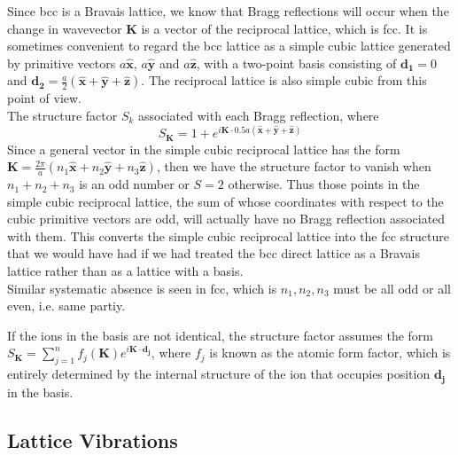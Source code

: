 \documentclass[a4paper]{article}
\begin{document}
\begin{eg}
Since bcc is a Bravais lattice, we know that Bragg reflections will occur when the change in wavevector $\mathbf{K}$ is a vector of the reciprocal lattice, which is fcc. It is sometimes convenient to regard the bcc lattice as a simple cubic lattice generated by primitive vectors $a\mathbf{\hat{x}}$, $a\mathbf{\hat{y}}$ and $a\mathbf{\hat{z}}$, with a two-point basis consisting of $\mathbf{d_1}=0$ and $\mathbf{d_2}=\frac{a}{2}(\mathbf{\hat{x}}+\mathbf{\hat{y}}+\mathbf{\hat{z}})$. The reciprocal lattice is also simple cubic from this point of view.\\[5pt]
The structure factor $S_k$ associated with each Bragg reflection, where $$S_\mathbf{K}=1+e^{i\mathbf{K}\cdot0.5a(\mathbf{\hat{x}}+\mathbf{\hat{y}}+\mathbf{\hat{z}})}$$
Since a general vector in the simple cubic reciprocal lattice has the form $\mathbf{K}=\frac{2\pi}{a}(n_1\mathbf{\hat{x}}+n_2\mathbf{\hat{y}}+n_3\mathbf{\hat{z}})$, then we have the structure factor to vanish when $n_1+n_2+n_3$ is an odd number or $S=2$ otherwise. Thus those points in the simple cubic reciprocal lattice, the sum of whose coordinates with respect to the cubic primitive vectors are odd, will actually have no Bragg reflection associated with them. This converts the simple cubic reciprocal lattice into the fcc structure that we would have had if we had treated the bcc direct lattice as a Bravais lattice rather than as a lattice with a basis.\\[5pt]
Similar systematic absence is seen in fcc, which is $n_1,n_2,n_3$ must be all odd or all even, i.e. same partiy.
\end{eg}
\begin{cor}
If the ions in the basis are not identical, the structure factor assumes the form $S_{\mathbf{K}}=\sum_{j=1}^nf_j(\mathbf{K})e^{i\mathbf{K}\cdot\mathbf{d_j}}$, where $f_j$ is known as the atomic form factor, which is entirely determined by the internal structure of the ion that occupies position $\mathbf{d_j}$ in the basis.
\end{cor}
\newpage
\subsection{Lattice Vibrations}
\end{document}
